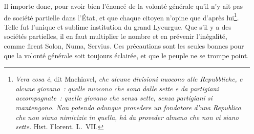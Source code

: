 \documentclass[french,twoside]{book} %
\begin{document}
Il importe donc, pour avoir bien l’énoncé de la volonté générale qu’il n’y ait pas de société partielle dans l’État, et que chaque citoyen n’opine que d’après lui\footnote{{\itshape Vera cosa è}, dit Machiavel, {\itshape che alcune divisioni nuocono alle Repubbliche, e alcune giovano : quelle nuocono che sono dalle sette e da partigiani accompagnate : quelle giovano che senza sette, senza partigiani si mantengono. Non potendo adunque provedere un fondatore d’una Republica che non siano nimicizie in quella, hà da proveder almeno che non vi siano sette.} Hist. Florent. L. VII.}. Telle fut l’unique et sublime institution du grand Lycurgue. Que s’il y a des sociétés partielles, il en faut multiplier le nombre et en prévenir l’inégalité, comme firent Solon, Numa, Servius. Ces précautions sont les seules bonnes pour que la volonté générale soit toujours éclairée, et que le peuple ne se trompe point.
\end{document}

